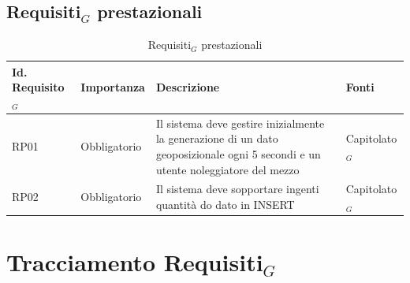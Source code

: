 \documentclass[11pt]{article}
\begin{document}
\begin{justify}
\subsection{Requisiti$_G$ prestazionali}

\begin{table}[H]
\centering
\renewcommand{\arraystretch}{1.5}
\begin{tabular}{|>{\centering\arraybackslash}m{2.7cm}|>{\centering\arraybackslash}m{2.7cm}|>{\centering\arraybackslash}m{6cm}|>{\centering\arraybackslash}m{2.1cm}|}
\hline
\textbf{Id. Requisito$_G$} & \textbf{Importanza} & \textbf{Descrizione} & \textbf{Fonti}\\
\hline
RP01 & Obbligatorio &  Il sistema deve gestire inizialmente la generazione di un dato geoposizionale ogni 5 secondi e un utente noleggiatore del mezzo & Capitolato$_G$\\
\hline
RP02 & Obbligatorio &  Il sistema deve sopportare ingenti quantità do dato in INSERT & Capitolato$_G$\\
\hline
\end{tabular}
\caption{Requisiti$_G$ prestazionali}
\end{table}



\newpage
\section{Tracciamento Requisiti$_G$}


\end{justify}
\end{document}
